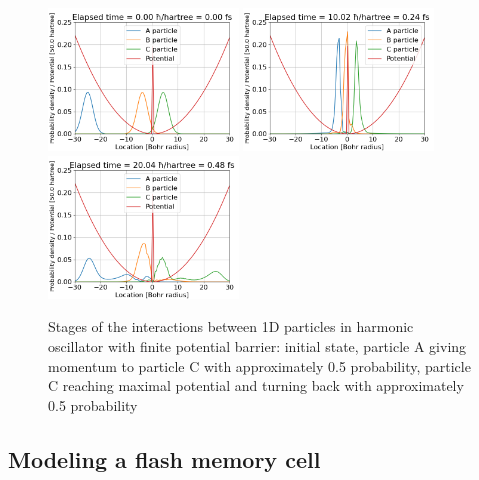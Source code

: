 \begin{figure}[hbtp!]
	\begin{center}
		\includegraphics[width=0.45\textwidth]{figures/1d_oscillator_tunneling_01.png}
		\includegraphics[width=0.45\textwidth]{figures/1d_oscillator_tunneling_02.png}
		\includegraphics[width=0.45\textwidth]{figures/1d_oscillator_tunneling_03.png}
		\caption{Stages of the interactions between 1D particles in harmonic oscillator with finite potential barrier: initial state, particle A giving momentum to particle C with approximately 0.5 probability, particle C reaching maximal potential and turning back with approximately 0.5 probability}
		\label{fig:1d_osc_with_tunneling}
	\end{center}	
\end{figure}

\FloatBarrier
\subsection{Modeling a flash memory cell}

